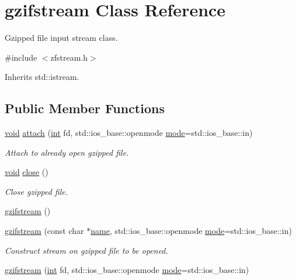 \hypertarget{classgzifstream}{}\section{gzifstream Class Reference}
\label{classgzifstream}


Gzipped file input stream class.  




{\ttfamily \#include $<$zfstream.\+h$>$}



Inherits std\+::istream.

\subsection*{Public Member Functions}
\begin{DoxyCompactItemize}
\item 
\hyperlink{lp__lib_8h_ac7828c7b2b31d2e11af17bdb6289c5d9}{void} \hyperlink{classgzifstream_a24aff901c395acbdaddb7878f4ddb7aa}{attach} (\hyperlink{lp__lib_8h_adeb9ec6400320e4923ac9d836d509ddb}{int} fd, std\+::ios\+\_\+base\+::openmode \hyperlink{ioapi_8h_ab77191763734fbb3e515371393ccb606}{mode}=std\+::ios\+\_\+base\+::in)
\begin{DoxyCompactList}\small\item\em Attach to already open gzipped file. \end{DoxyCompactList}\item 
\hyperlink{lp__lib_8h_ac7828c7b2b31d2e11af17bdb6289c5d9}{void} \hyperlink{classgzifstream_a073fadd9dc90195c47a6ae2d863c8ace}{close} ()
\begin{DoxyCompactList}\small\item\em Close gzipped file. \end{DoxyCompactList}\item 
\hyperlink{classgzifstream_a6fa19ba2a1eeaeab5f0a408082bc2edd}{gzifstream} ()
\item 
\hyperlink{classgzifstream_a90f6e0eea83b7ce3c64f755b51b5b011}{gzifstream} (const char $\ast$\hyperlink{lp__lib_8h_a2946c588fc7fa2fa5b43ac54b7872725}{name}, std\+::ios\+\_\+base\+::openmode \hyperlink{ioapi_8h_ab77191763734fbb3e515371393ccb606}{mode}=std\+::ios\+\_\+base\+::in)
\begin{DoxyCompactList}\small\item\em Construct stream on gzipped file to be opened. \end{DoxyCompactList}\item 
\hyperlink{classgzifstream_aa5ab9dcc3ab35bffe781f4c49239826e}{gzifstream} (\hyperlink{lp__lib_8h_adeb9ec6400320e4923ac9d836d509ddb}{int} fd, std\+::ios\+\_\+base\+::openmode \hyperlink{ioapi_8h_ab77191763734fbb3e515371393ccb606}{mode}=std\+::ios\+\_\+base\+::in)

\end{DoxyCompactItemize}
